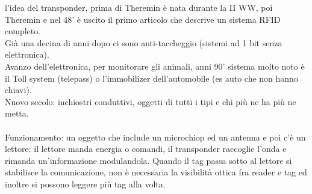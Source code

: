 \documentclass[oneside, 12pt]{extbook}
\begin{document}
l'idea del transponder, prima di Theremin è nata durante la II WW, poi Theremin e nel 48' è uscito il primo articolo che descrive un sistema RFID completo.\\Già una decina di anni dopo ci sono anti-taccheggio (sistemi ad 1 bit senza elettronica).\\Avanzo dell'elettronica, per monitorare gli animali, anni 90' sistema molto noto è il Toll system (telepass) o l'immobilizer dell'automobile (es auto che non hanno chiavi).\\Nuovo secolo: inchiostri conduttivi, oggetti di tutti i tipi e chi più ne ha più ne metta.\\\\Funzionamento: un oggetto che include un microchiop ed un antenna e poi c'è un lettore: il lettore manda energia o comandi, il transponder raccoglie l'onda e rimanda un'informazione modulandola. Quando il tag passa sotto al lettore si stabilisce la comunicazione, non è necessaria la visibilità ottica fra reader e tag ed inoltre si possono leggere più tag alla volta.
\end{document}
